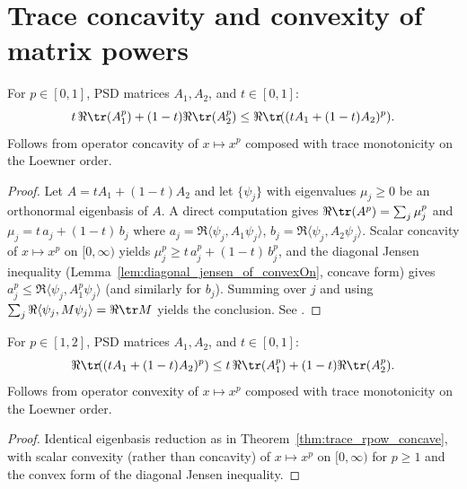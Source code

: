 \section{Trace concavity and convexity of matrix powers}

\begin{theorem}\label{thm:trace_rpow_concave}
    \leanok
    For $p\in[0,1]$, PSD matrices $A_1,A_2$, and $t\in[0,1]$:
    \[
        t\,\Re\tr(A_1^p)+(1-t) \Re\tr(A_2^p)
        \le
        \Re\tr\!((tA_1+(1-t)A_2)^p).
    \]
    Follows from operator concavity of $x\mapsto x^p$ composed with trace
    monotonicity on the Loewner order.
\end{theorem}

\begin{proof}\leanok
    Let $A=tA_1+(1-t)A_2$ and let $\{\psi_j\}$ with eigenvalues
    $\mu_j\ge 0$ be an orthonormal eigenbasis of $A$. A direct
    computation gives $\Re\tr(A^p)=\sum_j \mu_j^p$ and
    $\mu_j=t\,a_j+(1-t)\,b_j$ where
    $a_j=\Re\langle\psi_j,A_1\psi_j\rangle$,
    $b_j=\Re\langle\psi_j,A_2\psi_j\rangle$.
    Scalar concavity of $x\mapsto x^p$ on $[0,\infty)$ yields
    $\mu_j^p\ge t\,a_j^p+(1-t)\,b_j^p$, and the diagonal Jensen
    inequality (Lemma~\ref{lem:diagonal_jensen_of_convexOn},
    concave form) gives
    $a_j^p\le\Re\langle\psi_j,A_1^p\psi_j\rangle$ (and similarly for
    $b_j$). Summing over $j$ and using
    $\sum_j\Re\langle\psi_j,M\psi_j\rangle=\Re\tr M$ yields the
    conclusion. See \cite[Chapter~V]{Bhatia1997Matrix}.
\end{proof}

\begin{theorem}\label{thm:trace_rpow_convex}
    \leanok
    For $p\in[1,2]$, PSD matrices $A_1,A_2$, and $t\in[0,1]$:
    \[
        \Re\tr\!((tA_1+(1-t)A_2)^p)
        \le
        t\,\Re\tr(A_1^p)+(1-t) \Re\tr(A_2^p).
    \]
    Follows from operator convexity of $x\mapsto x^p$ composed with trace
    monotonicity on the Loewner order.
\end{theorem}

\begin{proof}\leanok
    Identical eigenbasis reduction as in
    Theorem~\ref{thm:trace_rpow_concave}, with scalar convexity
    (rather than concavity) of $x\mapsto x^p$ on $[0,\infty)$ for
    $p\ge 1$ and the convex form of the diagonal Jensen inequality.
\end{proof}

